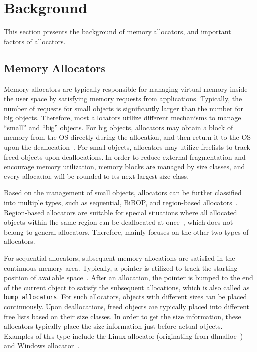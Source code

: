 \section{Background}

This section presents the background of memory allocators, and important factors of allocators. 

\subsection{Memory Allocators}

\label{sec:allocator}
Memory allocators are typically responsible for managing virtual memory inside the user space by satisfying memory requests from applications. Typically, the number of requests for small objects is significantly larger than the number for big objects. Therefore, most allocators utilize different mechanisms to manage ``small'' and ``big'' objects. For big objects, allocators may obtain a block of memory from the OS directly during the allocation, and then return it to the OS upon the deallocation~\cite{Hoard}. For small objects,  allocators may utilize freelists to track freed objects upon deallocations. In order to reduce external fragmentation and encourage memory utilization, memory blocks are managed by size classes, and every allocation will be rounded to its next largest size class.  

Based on the management of small objects, allocators can be further classified into multiple types, such as sequential, BiBOP, and region-based allocators~\cite{DieHarder, Gay:1998:MME:277650.277748}. Region-based allocators are suitable for special situations where all allocated objects within the same region can be deallocated at once~\cite{Gay:1998:MME:277650.277748}, which does not belong to general allocators. Therefore, \MP{} mainly focuses on the other two types of allocators. 

For sequential allocators, subsequent memory allocations are satisfied in the continuous memory area. Typically, a pointer is utilized to track the starting position of available space~\cite{Cling}. After an allocation, the pointer is bumped to the end of the current object to satisfy the subsequent allocations, which is also called as \texttt{bump allocators}. For such allocators, objects with different sizes can be placed continuously. Upon deallocations, freed objects are typically placed into different free lists based on their size classes. In order to get the size information, these allocators typically place the size information just before actual objects. Examples of this type include the Linux allocator (originating from dlmalloc~\cite{dlmalloc}) and Windows allocator~\cite{DieHarder}.  


